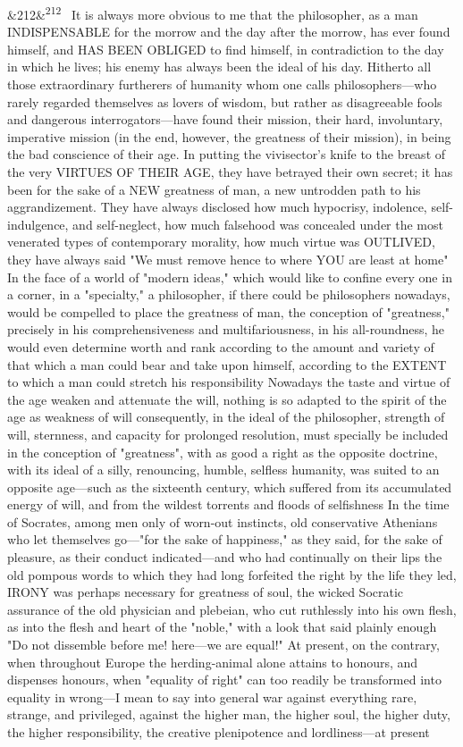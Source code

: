 \documentclass[12pt]{article}
\newcommand{\para}[1][]{\par\noindent\ifx&#1&\else\textsuperscript{\footnotesize #1}~\fi}
\begin{document}
\para[212] It is always more obvious to me that the philosopher, as a man INDISPENSABLE for the morrow and the day after the morrow, has ever found himself, and HAS BEEN OBLIGED to find himself, in contradiction to the day in which he lives; his enemy has always been the ideal of his day. Hitherto all those extraordinary furtherers of humanity whom one calls philosophers---who rarely regarded themselves as lovers of wisdom, but rather as disagreeable fools and dangerous interrogators---have found their mission, their hard, involuntary, imperative mission (in the end, however, the greatness of their mission), in being the bad conscience of their age. In putting the vivisector's knife to the breast of the very VIRTUES OF THEIR AGE, they have betrayed their own secret; it has been for the sake of a NEW greatness of man, a new untrodden path to his aggrandizement. They have always disclosed how much hypocrisy, indolence, self-indulgence, and self-neglect, how much falsehood was concealed under the most venerated types of contemporary morality, how much virtue was OUTLIVED, they have always said "We must remove hence to where YOU are least at home" In the face of a world of "modern ideas," which would like to confine every one in a corner, in a "specialty," a philosopher, if there could be philosophers nowadays, would be compelled to place the greatness of man, the conception of "greatness," precisely in his comprehensiveness and multifariousness, in his all-roundness, he would even determine worth and rank according to the amount and variety of that which a man could bear and take upon himself, according to the EXTENT to which a man could stretch his responsibility Nowadays the taste and virtue of the age weaken and attenuate the will, nothing is so adapted to the spirit of the age as weakness of will consequently, in the ideal of the philosopher, strength of will, sternness, and capacity for prolonged resolution, must specially be included in the conception of "greatness", with as good a right as the opposite doctrine, with its ideal of a silly, renouncing, humble, selfless humanity, was suited to an opposite age---such as the sixteenth century, which suffered from its accumulated energy of will, and from the wildest torrents and floods of selfishness In the time of Socrates, among men only of worn-out instincts, old conservative Athenians who let themselves go---"for the sake of happiness," as they said, for the sake of pleasure, as their conduct indicated---and who had continually on their lips the old pompous words to which they had long forfeited the right by the life they led, IRONY was perhaps necessary for greatness of soul, the wicked Socratic assurance of the old physician and plebeian, who cut ruthlessly into his own flesh, as into the flesh and heart of the "noble," with a look that said plainly enough "Do not dissemble before me! here---we are equal!" At present, on the contrary, when throughout Europe the herding-animal alone attains to honours, and dispenses honours, when "equality of right" can too readily be transformed into equality in wrong---I mean to say into general war against everything rare, strange, and privileged, against the higher man, the higher soul, the higher duty, the higher responsibility, the creative plenipotence and lordliness---at present 
\end{document}
